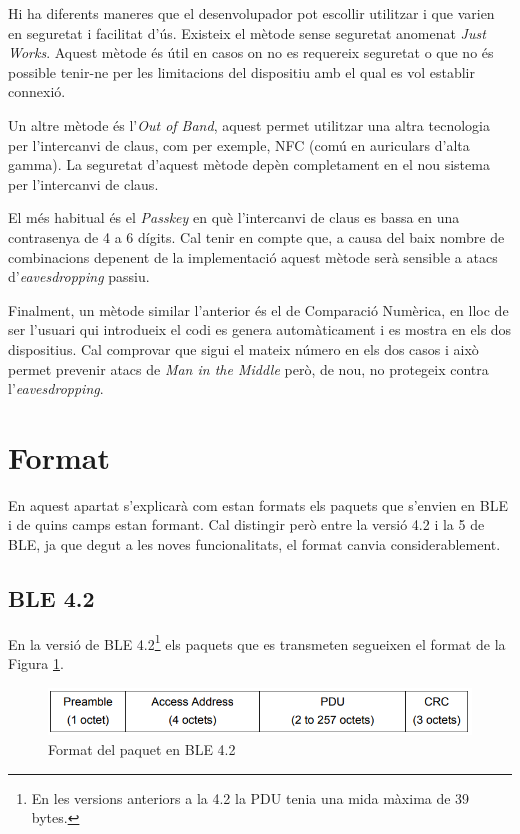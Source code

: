 Hi ha diferents maneres que el desenvolupador pot escollir utilitzar i que varien en seguretat i facilitat d'ús.
Existeix el mètode sense seguretat anomenat \textit{Just Works}.
Aquest mètode és útil en casos on no es requereix seguretat o que no és possible tenir-ne per les limitacions del dispositiu amb el qual es vol establir connexió.

Un altre mètode és l'\textit{Out of Band}, aquest permet utilitzar una altra tecnologia per l'intercanvi de claus, com per exemple, NFC (comú en auriculars d'alta gamma).
La seguretat d'aquest mètode depèn completament en el nou sistema per l'intercanvi de claus.

El més habitual és el \textit{Passkey} en què l'intercanvi de claus es bassa en una contrasenya de 4 a 6 dígits.
Cal tenir en compte que, a causa del baix nombre de combinacions depenent de la implementació aquest mètode serà sensible a atacs d'\textit{eavesdropping} passiu.

Finalment, un mètode similar l'anterior és el de Comparació Numèrica, en lloc de ser l'usuari qui introdueix el codi es genera automàticament i es mostra en els dos dispositius.
Cal comprovar que sigui el mateix número en els dos casos i això permet prevenir atacs de \textit{Man in the Middle} però, de nou, no protegeix contra l'\textit{eavesdropping}.

\section{Format}
\label{sec:format}
En aquest apartat s'explicarà com estan formats els paquets que s'envien en BLE i de quins camps estan formant.
Cal distingir però entre la versió 4.2 i la 5 de BLE, ja que degut a les noves funcionalitats, el format canvia considerablement.

\subsection{BLE 4.2}
En la versió de BLE 4.2\footnote{En les versions anteriors a la 4.2 la PDU tenia una mida màxima de 39 bytes.} els paquets que es transmeten segueixen el format de la Figura \ref{fig:4_2_format}.

\begin{figure}[!h]
	\begin{center}
		\includegraphics[width=1\textwidth]{./images/Packet_format_4_2.png}
		\caption{Format del paquet en BLE 4.2 \cite{BLE_4.2_packet_format}}
		\label{fig:4_2_format}
	\end{center}
\end{figure}

